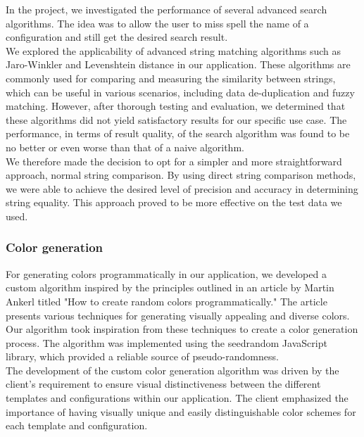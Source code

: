 In the project, we investigated the performance of several advanced search algorithms. The idea was to allow the user to miss spell the name of a configuration and still get the desired search result. \\

\noindent
We explored the applicability of advanced string matching algorithms such as Jaro-Winkler and Levenshtein distance in our application. These algorithms are commonly used for comparing and measuring the similarity between strings, which can be useful in various scenarios, including data de-duplication and fuzzy matching. \cite{medium_jaro_levenshtein} However, after thorough testing and evaluation, we determined that these algorithms did not yield satisfactory results for our specific use case. The performance, in terms of result quality, of the search algorithm was found to be no better or even worse than that of a naive algorithm. \\


\noindent
We therefore made the decision to opt for a simpler and more straightforward approach, normal string comparison. By using direct string comparison methods, we were able to achieve the desired level of precision and accuracy in determining string equality. This approach proved to be more effective on the test data we used. \\

\subsubsection{Color generation}

For generating colors programmatically in our application, we developed a custom algorithm inspired by the principles outlined in an article by Martin Ankerl titled "How to create random colors programmatically." The article presents various techniques for generating visually appealing and diverse colors. \cite{color_generation_algo} Our algorithm took inspiration from these techniques to create a color generation process. The algorithm was implemented using the seedrandom JavaScript library, which provided a reliable source of pseudo-randomness. \\

\noindent
The development of the custom color generation algorithm was driven by the client's requirement to ensure visual distinctiveness between the different templates and configurations within our application. The client emphasized the importance of having visually unique and easily distinguishable color schemes for each template and configuration. \\

